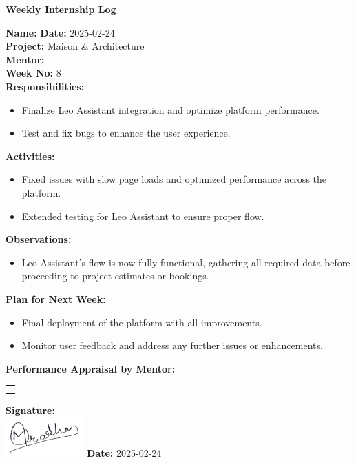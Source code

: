 \begin{center}
    \bfseries Weekly Internship Log
\end{center}

\noindent
\textbf{Name:}  \hfill \textbf{Date:} 2025-02-24 \\
\textbf{Project:} Maison \& Architecture \hfill \\
\textbf{Mentor:}  \\
\textbf{Week No:} 8 \\

\noindent
\textbf{Responsibilities:}
\begin{itemize}
    \item Finalize Leo Assistant integration and optimize platform performance.
    \item Test and fix bugs to enhance the user experience.
\end{itemize}

\noindent
\textbf{Activities:}
\begin{itemize}
    \item Fixed issues with slow page loads and optimized performance across the platform.
    \item Extended testing for Leo Assistant to ensure proper flow.
\end{itemize}

\noindent
\textbf{Observations:}
\begin{itemize}
    \item Leo Assistant’s flow is now fully functional, gathering all required data before proceeding to project estimates or bookings.
\end{itemize}

\noindent
\textbf{Plan for Next Week:}
\begin{itemize}
    \item Final deployment of the platform with all improvements.
    \item Monitor user feedback and address any further issues or enhancements.
\end{itemize}

\noindent
\textbf{Performance Appraisal by Mentor:} \\
\begin{table}[h]
    \centering
    \noindent
    \begin{tabularx}{\textwidth} { 
        | >{\centering\arraybackslash}X| }

        \hline
        \\ \\
        \hline
    \end{tabularx}
\end{table}

\vfill
\noindent
\textbf{Signature:} \\
\includegraphics[width=3cm]{assets/nirajpradhan-sign.png} \hfill \textbf{Date:} 2025-02-24
